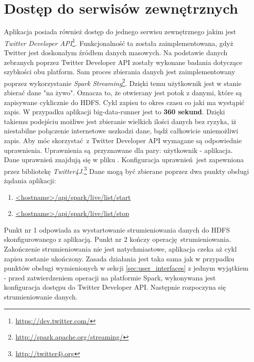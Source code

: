 \section{Dostęp do serwisów zewnętrznych}\label{sec:twitter-api}
Aplikacja posiada również dostęp do jednego serwisu zewnętrznego jakim jest \textit{Twitter Developer API}\footnote{\url{https://dev.twitter.com/}}. Funkcjonalność ta została zaimplementowana, gdyż Twitter jest doskonałym źródłem danych masowych. Na podstawie danych zebranych poprzez Twitter Developer API zostały wykonane badania dotyczące szybkości obu platform. Sam proces zbierania danych jest zaimplementowany poprzez wykorzystanie \textit{Spark Streaming}\footnote{\url{http://spark.apache.org/streaming/}}. Dzięki temu użytkownik jest w stanie zbierać dane "na żywo". Oznacza to, że otwierany jest potok z danymi, które są zapisywane cyklicznie do HDFS. Cykl zapisu to okres czasu co jaki ma wystąpić zapis. W przypadku aplikacji big-data-runner jest to \textbf{360 sekund}. Dzięki takiemu podejściu możliwe jest zbieranie wielkich ilości danych bez ryzyka, iż niestabilne połączenie internetowe uszkodzi dane, bądź całkowicie uniemożliwi zapis. Aby móc skorzystać z Twitter Developer API wymagane są odpowiednie uprawnienia. Uprawnienia są przyznawane dla pary: użytkownik - aplikacja. Dane uprawnień znajdują się w pliku . Konfiguracja uprawnień jest zapewniona przez bibliotekę \textit{Twitter4J}.\footnote{\url{http://twitter4j.org}}
\newline Dane mogą być zbierane poprzez dwa punkty obsługi żądania aplikacji:
\begin{enumerate}
	\item{\url{<hostname>/api/spark/live/list/start}}
	\item{\url{<hostname>/api/spark/live/list/stop}}
\end{enumerate}
Punkt nr 1 odpowiada za wystartowanie strumieniowania danych do HDFS skonfigurowanego z aplikacją. Punkt nr 2 kończy operację strumieniowania. Zakończenie strumieniowania nie jest natychmiastowe, aplikacja czeka aż cykl zapisu zostanie ukończony. Zasada działania jest taka sama jak w przypadku punktów obsługi wymienionych w sekcji \ref{sec:user_interfaces} z jednym wyjątkiem - przed zatwierdzeniem operacji na platformie Spark, wykonywana jest konfiguracja dostępu do Twitter Developer API. Następnie rozpoczyna się strumieniowanie danych.

